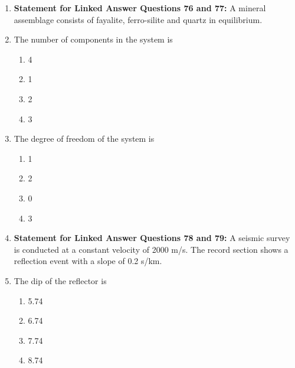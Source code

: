 \documentclass[journal,12pt,onecolumn]{IEEEtran}
\theoremstyle{remark}
\begin{document}
\begin{enumerate}
    \item[] \textbf{Statement for Linked Answer Questions 76 and 77:} A mineral assemblage consists of fayalite, ferro-silite and quartz in equilibrium.
    
    \item The number of components in the system is

    \hfill{}
    
    \begin{multicols}{4}
        \begin{enumerate}
            \item 4
            \item 1
            \item 2
            \item 3
        \end{enumerate}
    \end{multicols}

    \item The degree of freedom of the system is

    \hfill{}
    
    \begin{multicols}{4}
        \begin{enumerate}
            \item 1
            \item 2
            \item 0
            \item 3
        \end{enumerate}
    \end{multicols}

    \item[] \textbf{Statement for Linked Answer Questions 78 and 79:} A seismic survey is conducted at a constant velocity of 2000 m/s. The record section shows a reflection event with a slope of 0.2 s/km.
    
    \item The dip of the reflector  is

    \hfill{}
    
    \begin{multicols}{4}
        \begin{enumerate}
            \item 5.74
            \item 6.74
            \item 7.74
            \item 8.74
        \end{enumerate}
    \end{multicols}


\end{enumerate}
\end{document}
